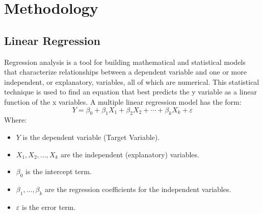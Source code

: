 \documentclass{ieeeojies}
\begin{document}
\section{Methodology}

\subsection{Linear Regression}
Regression analysis is a tool for building mathematical and statistical models that characterize relationships between a dependent variable and one or more independent, or explanatory, variables, all of which are numerical. This statistical technique is used to find an equation that best predicts the y variable as a linear function of the x variables.
A multiple linear regression model has the form: 
\[Y=\beta_0+\beta_1X_1+\beta_2X_2+\cdots+\beta_kX_k+\varepsilon\]
Where:
\begin{itemize}
	\item $Y$ is the dependent variable (Target Variable).
	\item $X_1, X_2, \ldots, X_k$ are the independent (explanatory) variables.
	\item $\beta_0$ is the intercept term.
	\item $\beta_1,..., \beta_k$ are the regression coefficients for the independent variables.
	\item $\varepsilon$ is the error term.
 \end{itemize}
\end{document}
